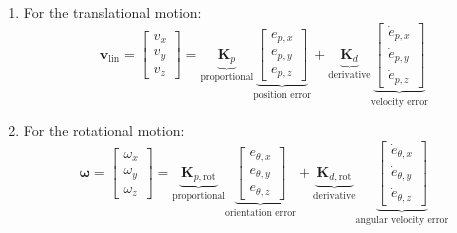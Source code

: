 \begin{enumerate}
    \item For the translational motion: 
    \[
        \mathbf{v}_{\text{lin}} = \begin{bmatrix}
            v_x \\
            v_y \\
            v_z
        \end{bmatrix} = \underbrace{\mathbf{K}_p}_{\text{proportional}} \underbrace{\begin{bmatrix}
            e_{p,x} \\
            e_{p,y} \\
            e_{p,z}
        \end{bmatrix}}_{\text{position error}} + \underbrace{\mathbf{K}_d}_{\text{derivative}} \underbrace{\begin{bmatrix}
            \dot{e}_{p,x} \\
            \dot{e}_{p,y} \\
            \dot{e}_{p,z}
        \end{bmatrix}}_{\text{velocity error}}
    \]
    \item For the rotational motion:
    \[
        \boldsymbol{\omega} = \begin{bmatrix}
            \omega_x \\
            \omega_y \\
            \omega_z
        \end{bmatrix} = \underbrace{\mathbf{K}_{p,\text{rot}}}_{\text{proportional}} \underbrace{\begin{bmatrix}
            e_{\theta,x} \\
            e_{\theta,y} \\
            e_{\theta,z}
        \end{bmatrix}}_{\text{orientation error}} + \underbrace{\mathbf{K}_{d,\text{rot}}}_{\text{derivative}} \underbrace{\begin{bmatrix}
            \dot{e}_{\theta,x} \\
            \dot{e}_{\theta,y} \\
            \dot{e}_{\theta,z}
        \end{bmatrix}}_{\text{angular velocity error}}
    \]
\end{enumerate}


